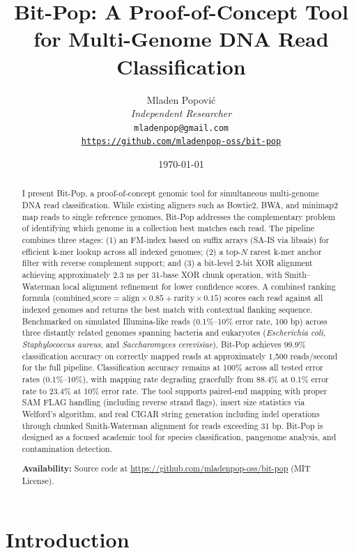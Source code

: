 \documentclass[utf8]{article}
\title{Bit-Pop: A Proof-of-Concept Tool for Multi-Genome DNA Read Classification}
\author{Mladen Popovi\'c\\
\textit{Independent Researcher} \\
\texttt{mladenpop@gmail.com} \\
\texttt{\url{https://github.com/mladenpop-oss/bit-pop}}}
\date{\today}
\begin{document}
\maketitle

\begin{abstract}
I present Bit-Pop, a proof-of-concept genomic tool for simultaneous multi-genome DNA read classification. While existing aligners such as Bowtie2, BWA, and minimap2 map reads to single reference genomes, Bit-Pop addresses the complementary problem of identifying which genome in a collection best matches each read. The pipeline combines three stages: (1) an FM-index based on suffix arrays (SA-IS via libsais) for efficient k-mer lookup across all indexed genomes; (2) a top-$N$ rarest k-mer anchor filter with reverse complement support; and (3) a bit-level 2-bit XOR alignment achieving approximately 2.3 ns per 31-base XOR chunk operation, with Smith--Waterman local alignment refinement \citep{smith1981} for lower confidence scores. A combined ranking formula ($\text{combined\_score} = \text{align} \times 0.85 + \text{rarity} \times 0.15$) scores each read against all indexed genomes and returns the best match with contextual flanking sequence. Benchmarked on simulated Illumina-like reads (0.1\%--10\% error rate, 100 bp) across three distantly related genomes spanning bacteria and eukaryotes (\textit{Escherichia coli}, \textit{Staphylococcus aureus}, and \textit{Saccharomyces cerevisiae}), Bit-Pop achieves 99.9\% classification accuracy on correctly mapped reads at approximately 1,500 reads/second for the full pipeline. Classification accuracy remains at 100\% across all tested error rates (0.1\%--10\%), with mapping rate degrading gracefully from 88.4\% at 0.1\% error rate to 23.4\% at 10\% error rate. The tool supports paired-end mapping with proper SAM FLAG handling (including reverse strand flags), insert size statistics via Welford's algorithm, and real CIGAR string generation including indel operations through chunked Smith-Waterman alignment for reads exceeding 31 bp. Bit-Pop is designed as a focused academic tool for species classification, pangenome analysis, and contamination detection.

\textbf{Availability:} Source code at \url{https://github.com/mladenpop-oss/bit-pop} (MIT License).
\end{abstract}

\section{Introduction}
\end{document}
